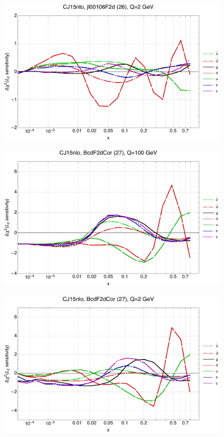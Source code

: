 \documentclass[10pt,aps,prd,floatfix,titlepage]{revtex4}
\begin{document}
\begin{figure}
\includegraphics[width=\textwidth,height=0.44\textheight,keepaspectratio]{1/26_CJ15nlo_L2_q2_Sf_1.pdf}
\caption{}
\end{figure}
\clearpage
\begin{figure}
\includegraphics[width=\textwidth,height=0.44\textheight,keepaspectratio]{1/27_CJ15nlo_L2_q100_Sf_1.pdf}
\caption{}
\end{figure}
\begin{figure}
\includegraphics[width=\textwidth,height=0.44\textheight,keepaspectratio]{1/27_CJ15nlo_L2_q2_Sf_1.pdf}
\caption{}
\end{figure}
\end{document}
